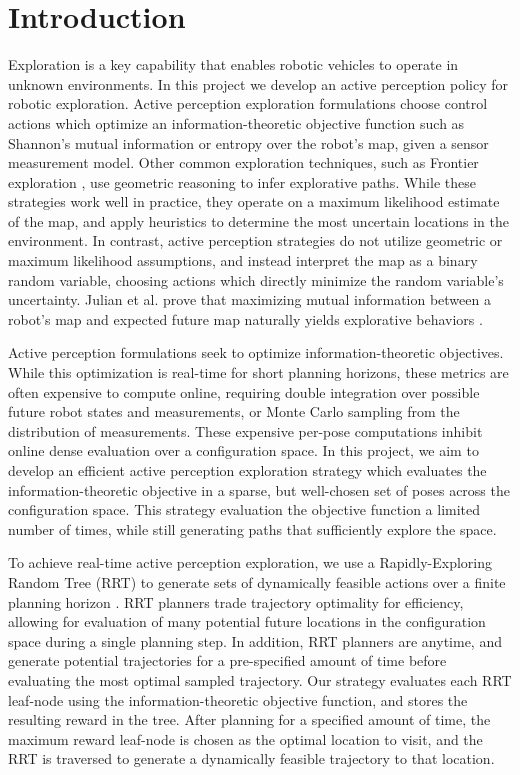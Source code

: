 \section{Introduction}
\label{sec:introduction}

Exploration is a key capability that enables robotic vehicles to operate in
unknown environments. In this project we develop an active perception policy
for robotic exploration. Active perception exploration formulations
choose control actions which optimize an information-theoretic objective
function such as Shannon's mutual information or entropy
\cite{bourgault2002information, stachniss2005information} over the robot's map,
given a sensor measurement model. Other common exploration techniques, such as Frontier
exploration \cite{}, use geometric reasoning to infer explorative paths.
While these strategies work well in practice, they operate on a
maximum likelihood estimate of the map, and apply heuristics to determine the most uncertain
locations in the environment. In contrast, active perception strategies do not utilize
geometric or maximum likelihood assumptions, and instead interpret the map as a binary
random variable, choosing actions which directly minimize the random variable's uncertainty.
Julian et al. prove that maximizing mutual information between a
robot's map and expected future map naturally yields explorative behaviors
\cite{julian2013mutual}.

Active perception formulations seek to optimize information-theoretic
objectives. While this optimization is real-time for short planning horizons,
these metrics are often expensive to compute online, requiring double
integration over possible future robot states and measurements, or Monte Carlo sampling
from the distribution of measurements. These expensive per-pose computations inhibit
online dense evaluation over a configuration space. In this project, we aim to develop an
efficient active perception exploration strategy which evaluates the
information-theoretic objective in a sparse, but well-chosen set of poses across the
configuration space. This strategy evaluation the objective function
a limited number of times, while still generating paths that sufficiently explore the space.

To achieve real-time active perception exploration, we use a Rapidly-Exploring Random Tree
(RRT) to generate sets of dynamically feasible actions over a finite planning horizon
\cite{Kuwata09_TCST}. RRT planners trade trajectory optimality for efficiency, allowing for evaluation
of many potential future locations in the configuration space during a single planning
step. In addition, RRT planners are anytime, and generate potential trajectories
for a pre-specified amount of time before evaluating the most optimal sampled trajectory. Our
strategy evaluates each RRT leaf-node using the information-theoretic objective function,
and stores the resulting reward in the tree. After planning for a specified
amount of time, the maximum reward leaf-node is chosen as the optimal location to
visit, and the RRT is traversed to generate a dynamically feasible trajectory to
that location.

